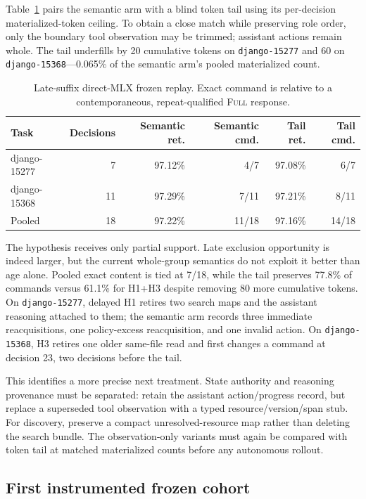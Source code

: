 \documentclass[11pt]{article}
\begin{document}
Table~\ref{tab:long-horizon-frozen} pairs the semantic arm with a blind token
tail using its per-decision materialized-token ceiling.  To obtain a close
match while preserving role order, only the boundary tool observation may be
trimmed; assistant actions remain whole.  The tail underfills by 20 cumulative
tokens on \texttt{django-15277} and 60 on \texttt{django-15368}---0.065\% of
the semantic arm's pooled materialized count.

\begin{table}[H]
\centering
\small
\caption{Late-suffix direct-MLX frozen replay.  Exact command is relative to a
contemporaneous, repeat-qualified \textsc{Full} response.}
\label{tab:long-horizon-frozen}
\begin{tabular}{lrrrrr}
\toprule
Task & Decisions & Semantic ret. & Semantic cmd. & Tail ret. & Tail cmd. \\
\midrule
django-15277 & 7 & 97.12\% & 4/7 & 97.08\% & 6/7 \\
django-15368 & 11 & 97.29\% & 7/11 & 97.21\% & 8/11 \\
\midrule
Pooled & 18 & 97.22\% & 11/18 & 97.16\% & 14/18 \\
\bottomrule
\end{tabular}
\end{table}

The hypothesis receives only partial support.  Late exclusion opportunity is
indeed larger, but the current whole-group semantics do not exploit it better
than age alone.  Pooled exact content is tied at 7/18, while the tail preserves
77.8\% of commands versus 61.1\% for H1+H3 despite removing 80 more cumulative
tokens.  On \texttt{django-15277}, delayed H1 retires two search maps and the
assistant reasoning attached to them; the semantic arm records three immediate
reacquisitions, one policy-excess reacquisition, and one invalid action.  On
\texttt{django-15368}, H3 retires one older same-file read and first changes a
command at decision 23, two decisions before the tail.

This identifies a more precise next treatment.  State authority and reasoning
provenance must be separated: retain the assistant action/progress record, but
replace a superseded tool observation with a typed resource/version/span stub.
For discovery, preserve a compact unresolved-resource map rather than deleting
the search bundle.  The observation-only variants must again be compared with
token tail at matched materialized counts before any autonomous rollout.

\subsection{First instrumented frozen cohort}
\end{document}
